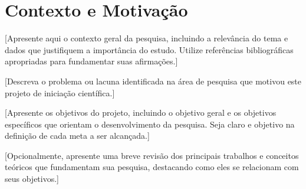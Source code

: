 
\section{Contexto e Motivação}


[Apresente aqui o contexto geral da pesquisa, incluindo a relevância do tema 
e dados que justifiquem a importância do estudo. Utilize referências 
bibliográficas apropriadas para fundamentar suas afirmações.]

%
%


[Descreva o problema ou lacuna identificada na área de pesquisa que motivou 
este projeto de iniciação científica.]


[Apresente os objetivos do projeto, incluindo o objetivo geral e os 
objetivos específicos que orientam o desenvolvimento da pesquisa. 
Seja claro e objetivo na definição de cada meta a ser alcançada.]


[Opcionalmente, apresente uma breve revisão dos principais trabalhos e 
conceitos teóricos que fundamentam sua pesquisa, destacando como eles 
se relacionam com seus objetivos.]

